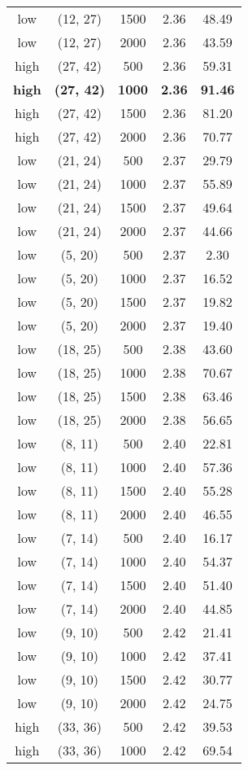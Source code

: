 \begin{tabular}{c c c c c}
low & (12, 27) &  1500 & 2.36 & 48.49 \\
low & (12, 27) &  2000 & 2.36 & 43.59 \\
high & (27, 42) &  500 & 2.36 & 59.31 \\
\textbf{high} & \textbf{(27, 42)} & \textbf{ 1000} & \textbf{2.36} & \textbf{91.46} \\
high & (27, 42) &  1500 & 2.36 & 81.20 \\
high & (27, 42) &  2000 & 2.36 & 70.77 \\
low & (21, 24) &  500 & 2.37 & 29.79 \\
low & (21, 24) &  1000 & 2.37 & 55.89 \\
low & (21, 24) &  1500 & 2.37 & 49.64 \\
low & (21, 24) &  2000 & 2.37 & 44.66 \\
low & (5, 20) &  500 & 2.37 & 2.30 \\
low & (5, 20) &  1000 & 2.37 & 16.52 \\
low & (5, 20) &  1500 & 2.37 & 19.82 \\
low & (5, 20) &  2000 & 2.37 & 19.40 \\
low & (18, 25) &  500 & 2.38 & 43.60 \\
low & (18, 25) &  1000 & 2.38 & 70.67 \\
low & (18, 25) &  1500 & 2.38 & 63.46 \\
low & (18, 25) &  2000 & 2.38 & 56.65 \\
low & (8, 11) &  500 & 2.40 & 22.81 \\
low & (8, 11) &  1000 & 2.40 & 57.36 \\
low & (8, 11) &  1500 & 2.40 & 55.28 \\
low & (8, 11) &  2000 & 2.40 & 46.55 \\
low & (7, 14) &  500 & 2.40 & 16.17 \\
low & (7, 14) &  1000 & 2.40 & 54.37 \\
low & (7, 14) &  1500 & 2.40 & 51.40 \\
low & (7, 14) &  2000 & 2.40 & 44.85 \\
low & (9, 10) &  500 & 2.42 & 21.41 \\
low & (9, 10) &  1000 & 2.42 & 37.41 \\
low & (9, 10) &  1500 & 2.42 & 30.77 \\
low & (9, 10) &  2000 & 2.42 & 24.75 \\
high & (33, 36) &  500 & 2.42 & 39.53 \\
high & (33, 36) &  1000 & 2.42 & 69.54 \\

\end{tabular}

